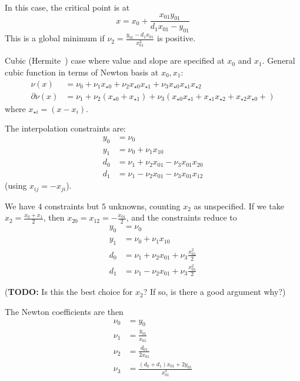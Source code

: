 In this case, the critical point is at
\begin{equation}
x = x_0 + \frac{x_{01} y_{01}}{d_1 x_{01} - y_{01}}
\end{equation}
This is a global minimum if 
$\nu_2 = \frac{y_{01} - d_1 x_{01}}{x_{01}^2}$
is positive.


Cubic (Hermite~\cite{wiki:cubic-hermite-spline}) 
case where value and slope are specified at $x_0$ and $x_1$.
General cubic function in terms of Newton basis at
$x_0, x_1$:
\begin{align}
\nu(x) & = \nu_0 + \nu_1 x_{{\star}0} + \nu_2 x_{{\star}0} x_{{\star}1} 
 + \nu_3 x_{{\star}0} x_{{\star}1} x_{{\star}2} \\
\partial{\nu}(x) & = \nu_1 
+ \nu_2 \left( x_{{\star}0} + x_{{\star}1} \right) 
+ \nu_3 \left( 
 x_{{\star}0} x_{{\star}1} +
 x_{{\star}1} x_{{\star}2} +
 x_{{\star}2} x_{{\star}0} +
\right)
\nonumber
\end{align}
where $x_{{\star}i} = \left(x - x_i\right)$.

The interpolation constraints are:
\begin{align}
y_0 & = \nu_0 
\\
y_1 & = \nu_0 + \nu_1 x_{10}  
\nonumber 
\\
d_0 & = \nu_1 + \nu_2 x_{01} - \nu_3 x_{01} x_{20} 
\\
d_1 & = \nu_1 - \nu_2 x_{01} - \nu_3 x_{01} x_{12} 
\nonumber
\end{align}
(using $x_{ij} = - x_{ji}$).

We have $4$ constraints but $5$ unknowns, counting $x_2$
as unspecified.
If we take $x_2 = \frac{x_0 + x_1}{2}$,
then $x_{20} = x_{12} = -\frac{x_{01}}{2}$,
and the constraints reduce to
\begin{align}
y_0 & = \nu_0 
\\
y_1 & = \nu_0 + \nu_1 x_{10}  
\nonumber 
\\
d_0 & = \nu_1 + \nu_2 x_{01} + \nu_3 \frac{x_{01}^2}{2} 
\\
d_1 & = \nu_1 - \nu_2 x_{01} + \nu_3 \frac{x_{01}^2}{2} 
\nonumber
\end{align}

(\textbf{TODO:} Is this the best choice for $x_2$? 
If so, is there a good argument why?)

The Newton coefficients are then
\begin{align}
\nu_0 & = y_0 
\\
\nu_1 & = \frac{y_{01}}{x_{01}}
\nonumber
\\ 
\nu_2 & = \frac{d_{01}}{2 x_{01}}
\nonumber
\\ 
\nu_3 & = \frac{ \left(d_0 + d_1 \right) x_{01} + 2 y_{01}}{x_{01}^3}
\nonumber
\end{align} 


